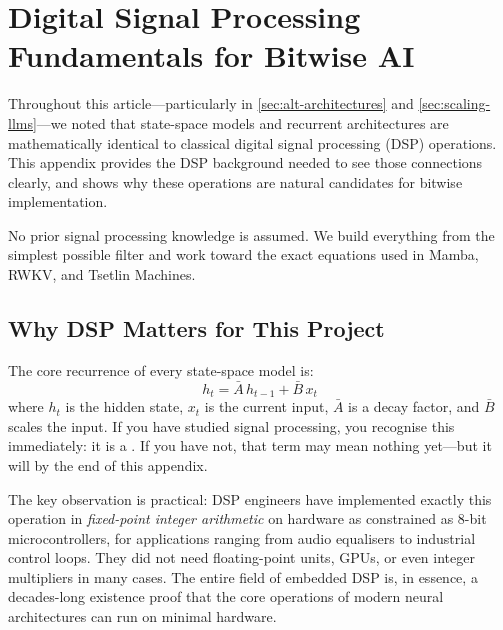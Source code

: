 \clearpage
\section{Digital Signal Processing Fundamentals for Bitwise AI}
\label{sec:appendix-dsp}

Throughout this article---particularly in \cref{sec:alt-architectures} and
\cref{sec:scaling-llms}---we noted that state-space models and recurrent
architectures are mathematically identical to classical digital signal
processing (DSP) operations. This appendix provides the DSP background
needed to see those connections clearly, and shows why these operations
are natural candidates for bitwise implementation.

No prior signal processing knowledge is assumed. We build everything from
the simplest possible filter and work toward the exact equations used in
Mamba, RWKV, and Tsetlin Machines.

\subsection{Why DSP Matters for This Project}
\label{sec:dsp-why}

The core recurrence of every state-space model is:
%
\begin{equation}
  h_t = \bar{A}\, h_{t-1} + \bar{B}\, x_t
  \label{eq:ssm-recurrence-appendix}
\end{equation}
%
where $h_t$ is the hidden state, $x_t$ is the current input,
$\bar{A}$ is a decay factor, and $\bar{B}$ scales the input.
If you have studied signal processing, you recognise this immediately:
it is a . If you have not, that term
may mean nothing yet---but it will by the end of this appendix.

The key observation is practical: DSP engineers have implemented
exactly this operation in \emph{fixed-point integer arithmetic} on
hardware as constrained as 8-bit microcontrollers, for applications
ranging from audio equalisers to industrial control loops. They did
not need floating-point units, GPUs, or even integer multipliers in
many cases. The entire field of embedded DSP is, in essence, a
decades-long existence proof that the core operations of modern
neural architectures can run on minimal hardware.


